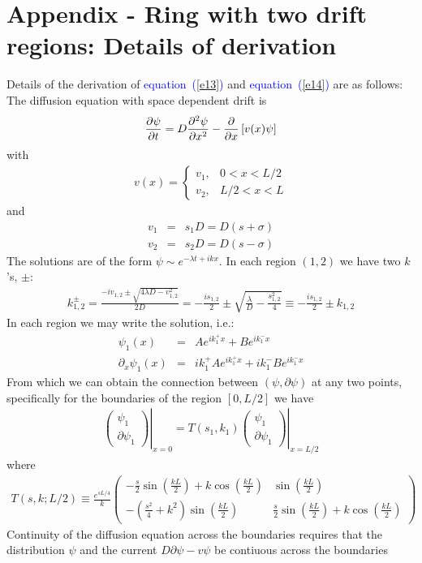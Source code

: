 \documentclass[aps,pre,floats,floatfix,fleqn,notitlepage]{revtex4-1}
\newcommand{\mylabel}[1]{\label{#1}}  %
\newcommand{\beq}{\begin{eqnarray}}
\newcommand{\eeq}{\end{eqnarray}}
\newcommand{\be}[1]{\begin{eqnarray}\ifthenelse{#1=-1}{\nonumber}{\ifthenelse{#1=0}{}{\mylabel{e#1}}}}
\newcommand{\ee}{\end{eqnarray}}
\newcommand{\Eq}[1]{\textcolor{blue}{equation~(\ref{#1})}} %
\begin{document}
\section{Appendix - Ring with two drift regions: Details of derivation}
Details of the derivation  of \Eq{e13} and \Eq{e14} are as follows:
The diffusion equation with space dependent drift is 
%
\be{15}
\frac{\partial \psi}{\partial t} = D \frac{\partial^2 \psi}{\partial x^2}- \frac{\partial}{\partial x} \left[v(x)\psi\right]
\ee
%
with 
%
\beq
v(x) = \left\{ \begin{array}{cc}
v_1, & 0< x<L/2 \\
v_2, & L/2<x<L
\end{array}
\right.
\eeq
%
and
% 
\beq
v_1 &=& s_1 D = D(s+\sigma)\\
v_2 &=& s_2 D = D(s-\sigma)
\eeq
%
The solutions are of the form $\psi \sim e^{-\lambda t + ikx}$. In each region $(1,2)$ we have two $k$'s, $\pm$:
\beq
k_{1,2}^{\pm} = \frac{-iv_{1,2} \pm \sqrt{4\lambda D - v_{1,2}^2}}{2D} = -\frac{is_{1,2}}{2} \pm \sqrt{\frac{\lambda}{D}-\frac{s_{1,2}^2}{4}} \equiv  -\frac{is_{1,2}}{2} \pm k_{1,2}
\eeq
%
In each region we may write the solution, i.e.:
%
\beq
\psi_1(x) &=& A e^{ik_1^+ x} + B e^{ik_1^- x} \\
\partial_x \psi_1(x) &=& ik_1^+ A e^{ik_1^+ x} + ik_1^- B e^{ik_1^- x} 
\eeq
%
From which we can obtain the connection between $(\psi,\partial \psi)$ at any two points, specifically for the boundaries of the region $[0,L/2]$ we have
%
\beq
\left.\left( \begin{array}{c}
\psi_1 \\
\partial \psi_1
\end{array}
\right)\right|_{x=0} = 
%
T(s_1,k_1)
%
\left.\left( \begin{array}{c}
\psi_1 \\
\partial \psi_1
\end{array}
\right)\right|_{x=L/2} 
\eeq
%
where 
%
\beq
T(s,k;L/2)\equiv
\frac{e^{s L/4}}{k}
\left(
\begin{array}{cc}
-\frac{s}{2}\sin\left(\frac{k L}{2}\right) + k\cos \left(\frac{k L}{2}\right) & \sin\left(\frac{k L}{2}\right)\\
-\left(\frac{s^2}{4}+k^2\right)\sin \left(\frac{k L}{2}\right) & \frac{s}{2} \sin \left(\frac{k L}{2}\right) + k \cos \left(\frac{k L}{2}\right)
\end{array}
\right)
\eeq
Continuity of the diffusion equation across the boundaries requires that 
the distribution $\psi$ and the current $D\partial \psi -v \psi$ be contiuous across the boundaries
\end{document}
